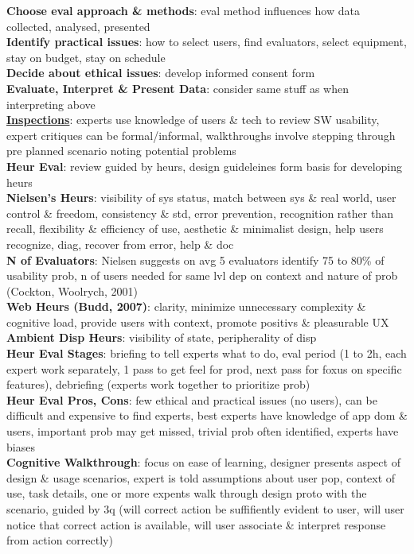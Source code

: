 \documentclass[a4paper]{article}
\begin{document}
\begin{multicols}{3}
        \textbf{Choose eval approach \& methods}: eval method influences how data collected, analysed, presented\\
        \textbf{Identify practical issues}: how to select users, find evaluators, select equipment, stay on budget, stay on schedule\\
        \textbf{Decide about ethical issues}: develop informed consent form\\
        \textbf{Evaluate, Interpret \& Present Data}: consider same stuff as when interpreting above\\
        \underline{\textbf{Inspections}}: experts use knowledge of users \& tech to review SW usability, expert critiques can be formal/informal, walkthroughs involve stepping through pre planned scenario noting potential problems\\
        \textbf{Heur Eval}: review guided by heurs, design guideleines form basis for developing heurs\\
        \textbf{Nielsen's Heurs}: visibility of sys status, match between sys \& real world, user control \& freedom, consistency \& std, error prevention, recognition rather than recall, flexibility \& efficiency of use, aesthetic \& minimalist design, help users recognize, diag, recover from error, help \& doc\\
        \textbf{N of Evaluators}: Nielsen suggests on avg 5 evaluators identify 75 to 80\% of usability prob, n of users needed for same lvl dep on context and nature of prob (Cockton, Woolrych, 2001)\\
        \textbf{Web Heurs (Budd, 2007)}: clarity, minimize unnecessary complexity \& cognitive load, provide users with context, promote positivs \& pleasurable UX\\
        \textbf{Ambient Disp Heurs}: visibility of state, peripherality of disp\\
        \textbf{Heur Eval Stages}: briefing to tell experts what to do, eval period (1 to 2h, each expert work separately, 1 pass to get feel for prod, next pass for foxus on specific features), debriefing (experts work together to prioritize prob)\\
        \textbf{Heur Eval Pros, Cons}: few ethical and practical issues (no users), can be difficult and expensive to find experts, best experts have knowledge of app dom \& users, important prob may get missed, trivial prob often identified, experts have biases\\
        \textbf{Cognitive Walkthrough}: focus on ease of learning, designer presents aspect of design \& usage scenarios, expert is told assumptions about user pop, context of use, task details, one or more expents walk through design proto with the scenario, guided by 3q (will correct action be suffifiently evident to user, will user notice that correct action is available, will user associate \& interpret response from action correctly)\\

\end{multicols}
\end{document}
